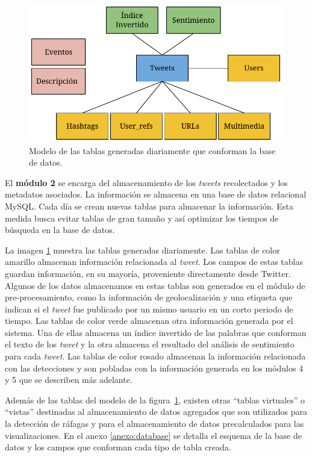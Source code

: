\begin{figure}[ht]
	\centering
	\includegraphics[width=0.8\linewidth]{imagenes/tweetmodel.pdf}
	\caption{Modelo de las tablas generadas diariamente que conforman la base de datos.}
	\label{img:database}
\end{figure}

El \textbf{módulo 2} se encarga del almacenamiento de los \textit{tweets} recolectados y los metadatos asociados. La información se almacena en una base de datos relacional MySQL. 
%
Cada día se crean nuevas tablas para almacenar la información. Esta medida busca evitar tablas de gran tamaño y así optimizar los tiempos de búsqueda en la base de datos. 


La imagen \ref{img:database} muestra las tablas generadas diariamente. 
%
Las tablas de color amarillo almacenan información relacionada al \textit{tweet}. 
%
Los campos de estas tablas guardan información, en su mayoría, proveniente directamente desde Twitter.
%
Algunos de los datos almacenamos en estas tablas son generados en el módulo de pre-procesamiento, como la información de geolocalización y una etiqueta que indican si el \textit{tweet} fue publicado por un mismo usuario en un corto periodo de tiempo.
%
Las tablas de color verde almacenan otra información generada por el sistema.
%
Una de ellas almacena un índice invertido de las palabras que conforman el texto de los \textit{tweet} y la otra almacena el resultado del análisis de sentimiento para cada \textit{tweet}. 
%
Las tablas de color rosado almacenan la información relacionada con las detecciones y son pobladas con la información generada en los módulos 4 y 5 que se describen más adelante. 


Además de las tablas del modelo de la figura~\ref{img:database}, existen otras ``tablas virtuales'' o ``vistas'' destinadas al almacenamiento de datos agregados que son utilizados para la detección de ráfagas y para el almacenamiento de datos precalculados para las visualizaciones.
%
En el anexo \ref{anexo:database} se detalla el esquema de la base de datos y los campos que conforman cada tipo de tabla creada.

